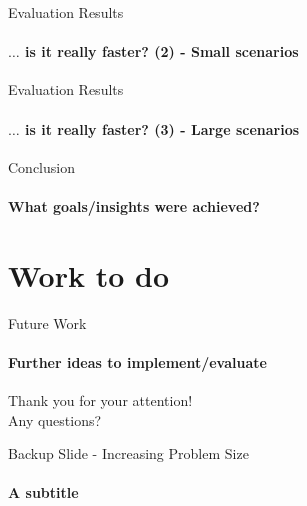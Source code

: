 \documentclass[
	english,%
	aspectratio=169,%
	accentcolor=1b,
	logo=true,%
	colorframetitle=true,%
	authorontitle=true,
	usepdftitle=false,
	design=2008,
	]{tudabeamer}
\begin{document}
\begin{frame}{Evaluation Results}
	\framesubtitle{$\ldots$ is it really faster? (2) - Small scenarios}
	\label{results-1}
	
\end{frame}

\begin{frame}{Evaluation Results}
	\framesubtitle{$\ldots$ is it really faster? (3) - Large scenarios}
	\label{results-2}
	
	\end{frame}

\begin{frame}[fragile]{Conclusion}
	\framesubtitle{What goals/insights were achieved?}
	\label{conclusion}
	
\end{frame}

\section{Work to do}

\begin{frame}{Future Work}
	\framesubtitle{Further ideas to implement/evaluate}
	\label{future-work}
	\vspace{2em}
	
\end{frame}

\begin{frame}[c]{}
	\label{thank-you}
	\centering
	\vspace{3em}
	\LARGE
	Thank you for your attention!\\
	Any questions?
\end{frame}

%
%

\begin{frame}{Backup Slide - Increasing Problem Size}
	\framesubtitle{A subtitle}
	\label{problem-size}
	
\end{frame}
\end{document}
